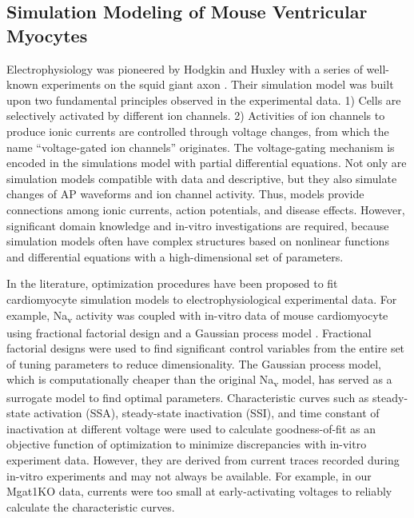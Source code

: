 \documentclass[10pt,letterpaper]{article}
\begin{document}
\subsection*{Simulation Modeling of Mouse Ventricular Myocytes}
Electrophysiology was pioneered by Hodgkin and Huxley with a series of well-known experiments on the squid giant axon \cite{hodgkin1952quantitative}. Their simulation model was built upon two fundamental principles observed in the experimental data. 1) Cells are selectively activated by different ion channels. 2) Activities of ion channels to produce ionic currents are controlled through voltage changes, from which the name ``voltage-gated ion channels'' originates. The voltage-gating mechanism is encoded in the simulations model with partial differential equations. Not only are simulation models compatible with data and descriptive, but they also simulate changes of AP waveforms and ion channel activity. Thus, models provide connections among ionic currents, action potentials, and disease effects. However, significant domain knowledge and in-vitro investigations are required, because simulation models often have complex structures based on nonlinear functions and differential equations with a high-dimensional set of parameters.

In the literature, optimization procedures have been proposed to fit cardiomyocyte simulation models to electrophysiological experimental data. For example, Na\textsubscript{v} activity was coupled with in-vitro data of mouse cardiomyocyte using fractional factorial design and a Gaussian process model \cite{du2015statistical}. Fractional factorial designs were used to find significant control variables from the entire set of tuning parameters to reduce dimensionality. The Gaussian process model, which is computationally cheaper than the original Na\textsubscript{v} model, has served as a surrogate model to find optimal parameters. Characteristic curves such as steady-state activation (SSA), steady-state inactivation (SSI), and time constant of inactivation at different voltage were used to calculate goodness-of-fit as an objective function of optimization to minimize discrepancies with in-vitro experiment data. However, they are derived from current traces recorded during in-vitro experiments and may not always be available. For example, in our Mgat1KO data, currents were too small at early-activating voltages to reliably calculate the characteristic curves.  
\end{document}
